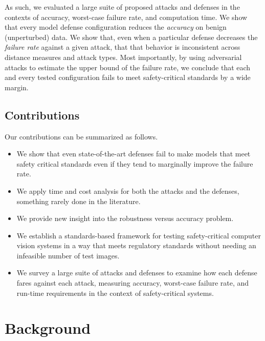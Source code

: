 \documentclass[lettersize,journal]{IEEEtran}
\begin{document}
As such, we evaluated a large suite of proposed attacks and defenses in the contexts of accuracy, worst-case failure rate, and computation time. We show that every model defense configuration reduces the \textit{accuracy} on benign (unperturbed) data. We show that, even when a particular defense decreases the \textit{failure rate} against a given attack, that that behavior is inconsistent across distance measures and attack types. Most importantly, by using adversarial attacks to estimate the upper bound of the failure rate, we conclude that each and every tested configuration fails to meet safety-critical standards by a wide margin.

\subsection{Contributions} 
Our contributions can be summarized as follows.

\begin{itemize}
    \item We show that even state-of-the-art defenses fail to make models that meet safety critical standards even if they tend to marginally improve the failure rate.
    \item We apply time and cost analysis for both the attacks and the defenses, something rarely done in the literature.
    \item We provide new insight into the robustness versus accuracy problem.
    \item We establish a standards-based framework for testing safety-critical computer vision systems in a way that meets regulatory standards without needing an infeasible number of test images.
    \item We survey a large suite of attacks and defenses to examine how each defense fares against each attack, measuring accuracy, worst-case failure rate, and run-time requirements in the context of safety-critical systems.
\end{itemize}


\section{Background}
\end{document}
